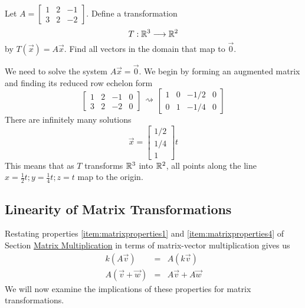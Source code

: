 \documentclass{ximera}
\begin{document}
\begin{example}\label{ex:matrixTrans1}
    Let $A=\begin{bmatrix}1&2&-1\\3&2&-2\end{bmatrix}$.  Define a transformation 
    $$T:\mathbb{R}^3\longrightarrow\mathbb{R}^2$$ by 
    $T(\vec{x})=A\vec{x}$.  Find all vectors in the domain that map to $\vec{0}$.
 \begin{explanation}
    We need to solve the system $A\vec{x}=\vec{0}$.  We begin by forming an augmented matrix and finding its reduced row echelon form
    $$\left[\begin{array}{ccc|c} 
 1&2&-1&0\\3&2&-2&0
 \end{array}\right]\begin{array}{c}
 \\
 \rightsquigarrow\\
 \\
 \end{array}\left[\begin{array}{ccc|c} 
 1&0&-1/2&0\\0&1&-1/4&0
 \end{array}\right]$$
 There are infinitely many solutions
 $$\vec{x}=\begin{bmatrix}1/2\\1/4\\1\end{bmatrix}t$$
 This means that as $T$ transforms $\mathbb{R}^3$ into $\mathbb{R}^2$, all points along the line $x=\frac{1}{2}t; y=\frac{1}{4}t; z=t$ map to the origin.
\end{explanation}    
\end{example}

\subsection*{Linearity of Matrix Transformations}
Restating properties \ref{item:matrixproperties1} and \ref{item:matrixproperties4} of Section \href{https://ximera.osu.edu/oerlinalg/LinearAlgebra/MAT-0020/main}{Matrix Multiplication} in terms of matrix-vector multiplication gives us
\begin{eqnarray}\label{eq:linearityConstant}
 k(A\vec{v})&=&A(k\vec{v})\\
    A(\vec{v}+\vec{w})&=&A\vec{v}+A\vec{w}\label{eq:linearityAdd}
   \end{eqnarray}
We will now examine the implications of these properties for matrix transformations.
\end{document}
